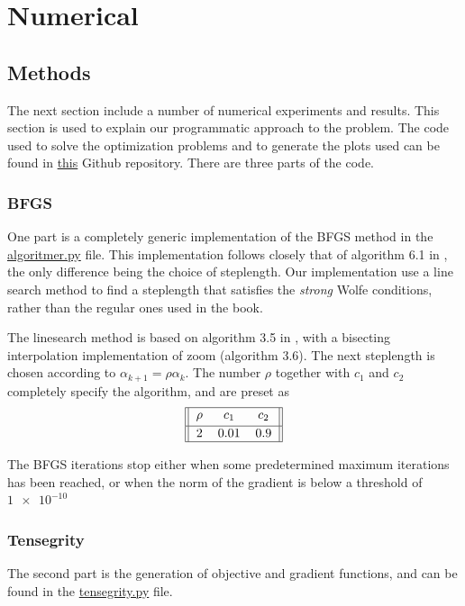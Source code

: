 \section{Numerical}
\subsection{Methods}
The next section include a number of numerical experiments and results. This section is used to explain our programmatic approach to the problem. The code used to solve the optimization problems and to generate the plots used can be found in \href{https://github.com/otkulseng/Opt1_Project}{this} Github repository. There are three parts of the code. 
\subsubsection{BFGS}
One part is a completely generic implementation of the BFGS method in the \href{https://github.com/otkulseng/Opt1_Project/blob/main/Kode/algoritmer.py}{algoritmer.py} file. This implementation follows closely that of algorithm 6.1 in \cite{NW}, the only difference being the choice of steplength. Our implementation use a line search method to find a steplength that satisfies the \emph{strong} Wolfe conditions, rather than the regular ones used in the book.

The linesearch method is based on algorithm 3.5 in \cite{NW}, with a bisecting interpolation implementation of zoom (algorithm 3.6). The next steplength is chosen according to $\alpha_{k+1} = \rho \alpha_k$. The number $\rho$ together with $c_1$ and $c_2$ completely specify the algorithm, and are preset as
\begin{gather}    
\begin{tabular}{||c c c||} 
 \hline
 $\rho$ & $c_1$ & $c_2$ \\ [0.5ex] 
 \hline
2 & 0.01 & 0.9  \\ 
 \hline
\end{tabular}
\end{gather}


The BFGS iterations stop either when some predetermined maximum iterations has been reached, or when the norm of the gradient is below a threshold of $\num{1e-10}$

\subsubsection{Tensegrity}
The second part is the generation of objective and gradient functions, and can be found in the \href{https://github.com/otkulseng/Opt1_Project/blob/main/Kode/tensegrity.py}{tensegrity.py} file. 

